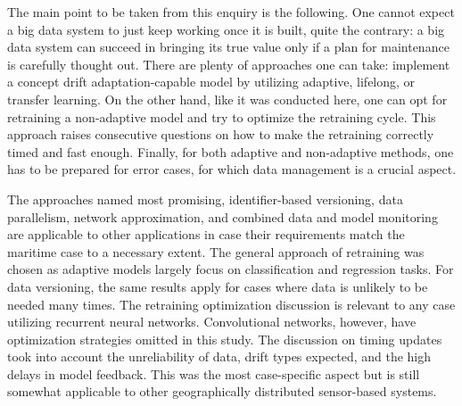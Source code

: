 The main point to be taken from this enquiry is the following. One cannot expect a big data system to just keep working once it is built, quite the contrary: a big data system can succeed in bringing its true value only if a plan for maintenance is carefully thought out. There are plenty of approaches one can take: implement a concept drift adaptation-capable model by utilizing adaptive, lifelong, or transfer learning. On the other hand, like it was conducted here, one can opt for retraining a non-adaptive model and try to optimize the retraining cycle. This approach raises consecutive questions on how to make the retraining correctly timed and fast enough. Finally, for both adaptive and non-adaptive methods, one has to be prepared for error cases, for which data management is a crucial aspect.

The approaches named most promising, identifier-based versioning, data parallelism, network approximation, and combined data and model monitoring are applicable to other applications in case their requirements match the maritime case to a necessary extent. The general approach of retraining was chosen as adaptive models largely focus on classification and regression tasks. For data versioning, the same results apply for cases where data is unlikely to be needed many times. The retraining optimization discussion is relevant to any case utilizing recurrent neural networks. Convolutional networks, however, have optimization strategies omitted in this study. The discussion on timing updates took into account the unreliability of data, drift types expected, and the high delays in model feedback. This was the most case-specific aspect but is still somewhat applicable to other geographically distributed sensor-based systems.


 
 

